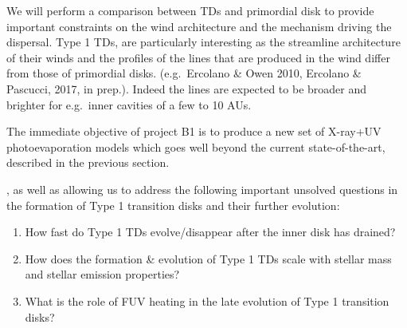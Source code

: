 \documentclass[10pt,fleqn,twoside]{article}
\begin{document}

We will perform a comparison between TDs and
primordial disk to provide important constraints on the wind
architecture and the mechanism driving the dispersal. 
Type 1 TDs, are particularly interesting as the streamline architecture of their winds
and the profiles of the lines that are produced in the wind
differ from those of primordial disks. (e.g.\ Ercolano \& Owen
2010, Ercolano \& Pascucci, 2017, in prep.). Indeed the lines
are expected to be broader and brighter for e.g.\ inner cavities of a few to 10 AUs.  

The immediate objective of project B1 is to produce a new set of
X-ray+UV photoevaporation models which goes well beyond the current
state-of-the-art, described in the previous section. 

, as well as
allowing us to address the following important unsolved questions in
the formation of Type 1 transition disks and their further evolution: 

\begin{enumerate}
\item How fast do Type 1 TDs evolve/disappear after the inner disk has
  drained?
\item How does the formation \& evolution of Type 1 TDs scale with
  stellar mass and stellar emission properties?
\item What is the role of FUV heating in the late evolution of Type 1
  transition disks? 
\end{enumerate}

\end{document}
